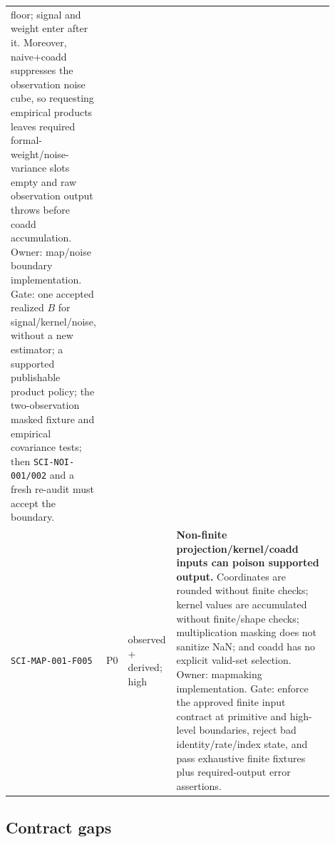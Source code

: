 \documentclass[11pt]{article}
\newcommand{\code}[1]{\nolinkurl{#1}}
\begin{document}
\begin{longtable}{L{0.20\linewidth}L{0.06\linewidth}L{0.15\linewidth}L{0.49\linewidth}}
floor; signal and weight enter after it.  Moreover, naive+coadd suppresses the
observation noise cube, so requesting empirical products leaves required
formal-weight/noise-variance slots empty and raw observation output throws
before coadd accumulation.  Owner: map/noise boundary implementation.  Gate:
one accepted realized \(B\) for signal/kernel/noise, without a new estimator;
a supported publishable product policy; the two-observation masked
fixture and empirical covariance tests; then \code{SCI-NOI-001/002} and a fresh
re-audit must accept the boundary.\\
\code{SCI-MAP-001-F005} & P0 & observed + derived; high &
\textbf{Non-finite projection/kernel/coadd inputs can poison supported output.}
Coordinates are rounded without finite checks; kernel values are accumulated
without finite/shape checks; multiplication masking does not sanitize NaN; and
coadd has no explicit valid-set selection.  Owner: mapmaking implementation.
Gate: enforce the approved finite input contract at primitive and high-level
boundaries, reject bad identity/rate/index state, and pass exhaustive finite
fixtures plus required-output error assertions.\\
\bottomrule
\end{longtable}

\subsection{Contract gaps}
\end{document}
